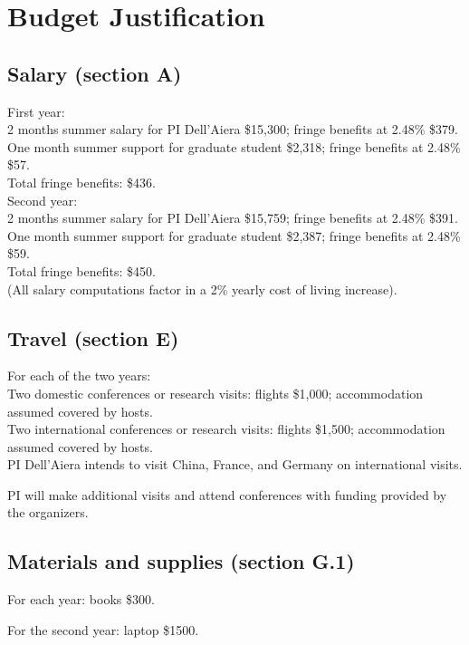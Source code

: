 \documentclass[11pt]{article}
\begin{document}
\section*{Budget Justification}

\subsection*{Salary (section A)}

\noindent  First year:\\
2 months summer salary for PI Dell'Aiera \$15,300; fringe benefits at 2.48\% \$379.\\
One month summer support for graduate student \$2,318; fringe benefits at 2.48\% \$57.\\
Total fringe benefits: \$436.\\

\noindent Second year:\\
2 months summer salary for PI Dell'Aiera \$15,759; fringe benefits at 2.48\% \$391.\\
One month summer support for graduate student \$2,387; fringe benefits at 2.48\% \$59.\\
Total fringe benefits: \$450.\\

\noindent (All salary computations factor in a 2\% yearly cost of living increase).

\subsection*{Travel (section E)}

For each of the two years:\\

\noindent Two domestic conferences or research visits: flights \$1,000; accommodation assumed covered by hosts.\\  

\noindent Two international conferences or research visits: flights \$1,500; accommodation assumed covered by hosts.\\ 

\noindent PI Dell'Aiera intends to visit China, France, and Germany on international visits.

\noindent PI will make additional visits and attend conferences with funding provided by the organizers.

\subsection*{Materials and supplies (section G.1)}

For each year: books \$300.

\noindent For the second year: laptop \$1500.
\end{document}
